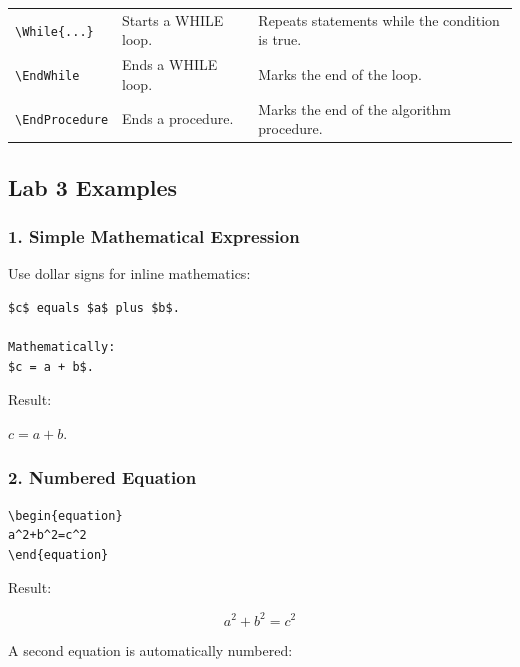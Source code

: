 \documentclass[a4paper,10pt]{article}
\begin{document}
\begin{longtable}{p{} p{} p{}}
\texttt{\textbackslash While\{...\}} &
Starts a WHILE loop. &
Repeats statements while the condition is true.
\\

\texttt{\textbackslash EndWhile} &
Ends a WHILE loop. &
Marks the end of the loop.
\\

\texttt{\textbackslash EndProcedure} &
Ends a procedure. &
Marks the end of the algorithm procedure.
\\

\end{longtable}



\subsection{Lab 3 Examples}

\subsubsection{1. Simple Mathematical Expression}

Use dollar signs for inline mathematics:

\begin{verbatim}
$c$ equals $a$ plus $b$.

Mathematically:
$c = a + b$.
\end{verbatim}

Result:

$c = a+b$.


\subsubsection{2. Numbered Equation}

\begin{verbatim}
\begin{equation}
a^2+b^2=c^2
\end{equation}
\end{verbatim}

Result:

\begin{equation}
a^2+b^2=c^2
\end{equation}

A second equation is automatically numbered:
\end{document}
